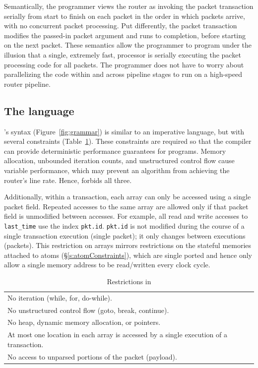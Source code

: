 Semantically, the programmer views the router as invoking the packet
transaction serially from start to finish on each packet in the order in which
packets arrive, with no concurrent packet processing.  Put differently, the
packet transaction modifies the passed-in packet argument and runs to
completion, before starting on the next packet.  These semantics allow the
programmer to program under the illusion that a single, extremely fast,
processor is serially executing the packet processing code for all packets. The
programmer does not have to worry about parallelizing the code within and
across pipeline stages to run on a high-speed router pipeline.

\subsection{The \pktlanguage language}
\label{ss:constraints}
\pktlanguage's syntax (Figure~\ref{fig:grammar}) is similar to an imperative
language, but with several constraints (Table~\ref{tab:restrict}).  These
constraints are required so that the compiler can provide deterministic
performance guarantees for \pktlanguage programs.  Memory allocation, unbounded
iteration counts, and unstructured control flow cause variable performance,
which may prevent an algorithm from achieving the router's line rate. Hence,
\pktlanguage forbids all three.

Additionally, within a \pktlanguage transaction, each array can only be
accessed using a single packet field. Repeated accesses to the same array are
allowed only if that packet field is unmodified between accesses. For example,
all read and write accesses to \texttt{last\_time} use the index
\texttt{pkt.id}. \texttt{pkt.id} is not modified during the course of a single
transaction execution (single packet); it only changes between executions
(packets).  This restriction on arrays mirrors restrictions on the stateful
memories attached to atoms (\S\ref{s:atomConstraints}), which are single ported
and hence only allow a single memory address to be read/written every clock
cycle.

\begin{table}
  \begin{tabular}{p{}}
   No iteration (while, for, do-while).\\
   No unstructured control flow (goto, break, continue).\\
   No heap, dynamic memory allocation, or pointers.\\
   At most one location in each array is accessed by a single execution of a transaction. \\
   No access to unparsed portions of the packet (payload).\\
  \end{tabular}
  \caption{Restrictions in \pktlanguage}
  \label{tab:restrict}
\end{table}

